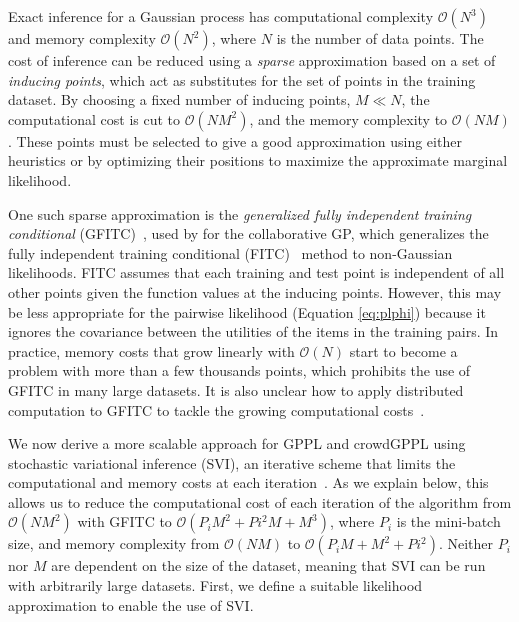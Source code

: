Exact inference for a Gaussian process has computational complexity $\mathcal{O}(N^3)$ 
and memory complexity $\mathcal{O}(N^2)$, where $N$ is the number of data points.
The cost of inference can be reduced using a \emph{sparse} approximation based on a set of 
\emph{inducing points}, which act as substitutes for the set of points in the training dataset.
By choosing a fixed number of inducing points, $M \ll N$, the computational cost is cut to $\mathcal{O}(NM^2)$,
and the memory complexity to $\mathcal{O}(NM)$.
These points must be selected to give a good approximation
using either heuristics or by optimizing their positions to maximize the approximate
marginal likelihood. 

One such sparse approximation is the \emph{generalized fully independent training conditional} (GFITC)~\citep{NIPS2007_3351}, 
used by \citet{houlsby2012collaborative} for the collaborative GP,
which generalizes the fully independent training conditional 
(FITC)~\citep{snelson2006sparse} method to non-Gaussian likelihoods.
FITC assumes that each training and test point is independent of all other points
given the function values at the inducing points.
However, this may be less appropriate for the pairwise likelihood (Equation \ref{eq:plphi})
because it ignores the covariance between the utilities of the items in the training
pairs.
In practice, memory costs that grow linearly with $\mathcal{O}(N)$
start to become a problem with more than a few thousands points,
which prohibits the use of GFITC in many large datasets. 
It is also unclear how to apply distributed computation to GFITC to tackle the growing
computational costs~\citep{hensman2015scalable}.

We now derive a more scalable approach for GPPL and crowdGPPL using
stochastic variational inference (SVI), an iterative scheme that limits the computational and memory costs at
each iteration~\citep{hoffman2013stochastic}.
As we explain below,
this allows us to reduce the computational cost of each iteration of the algorithm from 
$\mathcal{O}(NM^2)$ with GFITC to $\mathcal{O}(P_i M^2 + Pi^2 M + M^3)$,
where $P_i$ is the mini-batch size, 
and memory complexity from $\mathcal{O}(NM)$ to
$\mathcal{O}(P_i M + M^2  + Pi^2)$.
Neither $P_i$ nor $M$ are dependent on the size of the dataset, meaning that SVI 
can be run with arbitrarily large datasets.
First, we define a suitable likelihood approximation to enable the use of SVI.

